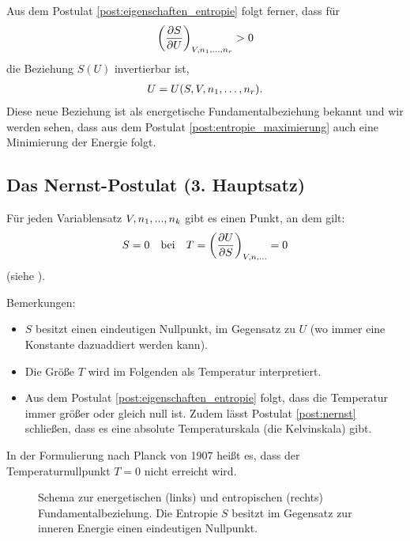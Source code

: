 Aus dem Postulat \ref{post:eigenschaften_entropie} folgt ferner, dass für 
\begin{align*}
    \left(\frac{\partial S}{\partial U}\right)_{V,n_1, \dots ,n_r} > 0
\end{align*}
die Beziehung $S(U)$ invertierbar ist, 
\begin{align*}
    U = U(S,V,n_1, \dots,n_r). 
\end{align*}
Diese neue Beziehung ist als energetische Fundamentalbeziehung bekannt und wir werden sehen, dass aus dem Postulat \ref{post:entropie_maximierung} auch eine Minimierung der Energie folgt. 



\subsection{Das Nernst-Postulat (3. Hauptsatz)}



\begin{postulate}
    \label{post:nernst}
    Für jeden Variablensatz $V,n_1,...,n_k$ gibt es einen Punkt, an dem gilt:
    \begin{align}
        \label{eq:nernst_postulat}
        S = 0 \quad \text{bei} \quad T =\left(\frac{\partial U}{\partial S}\right)_{V,n,...}=0
    \end{align}
    (siehe ).
\end{postulate}

Bemerkungen: 
\begin{itemize}
    \item $S$ besitzt einen eindeutigen Nullpunkt, im Gegensatz zu $U$ (wo immer eine Konstante dazuaddiert werden kann). 
    \item Die Größe $T$ wird im Folgenden als Temperatur interpretiert.
    \item Aus dem Postulat \ref{post:eigenschaften_entropie} folgt, dass die Temperatur immer größer oder gleich null ist. Zudem lässt Postulat \ref{post:nernst} schließen, dass es eine absolute Temperaturskala (die Kelvinskala) gibt. 
\end{itemize}

In der Formulierung nach Planck von 1907 heißt es, dass der Temperaturnullpunkt $T=0$ nicht erreicht wird. 

\begin{figure}[htbp]
    \centering
    \tfigSchemaFundamentalbeziehung
    \caption{Schema zur energetischen (links) und entropischen (rechts) Fundamentalbeziehung. Die Entropie $S$ besitzt im Gegensatz zur inneren Energie einen eindeutigen Nullpunkt.  }
    \label{fig:SchemaFundamentalbeziehung}
\end{figure}
